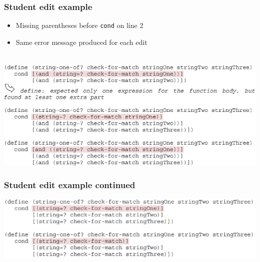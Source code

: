 \documentclass{beamer}
\begin{document}

\begin{frame}
 \frametitle{Student edit example}
 \begin{itemize}
 \item Missing parentheses before \texttt{cond} on line 2
 \item Same error message produced for each edit
 \end{itemize}
      \
      \includegraphics[width=0.9\paperwidth]{RacketStudentEditPt1.pdf}
      		\\
\end{frame}

\begin{frame}
 \frametitle{Student edit example continued}
       \includegraphics[width=0.9\paperwidth]{RacketStudentEditPt2.pdf}
       		\\
\end{frame}
\end{document}
